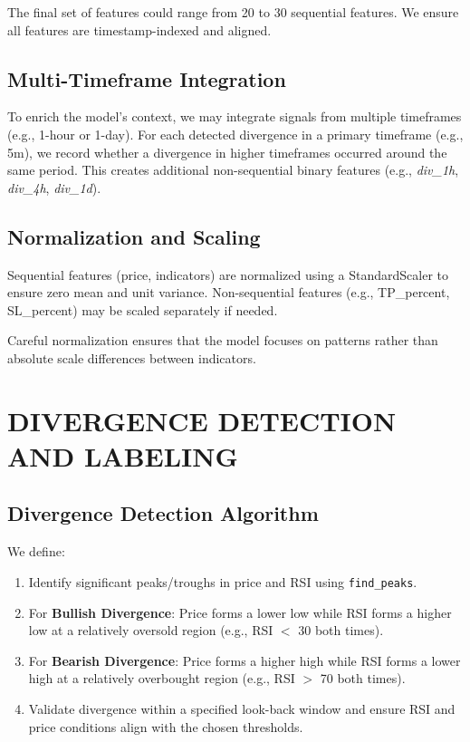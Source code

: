 \documentclass[letterpaper, 10 pt, conference]{ieeeconf}  %
\begin{document}
The final set of features could range from 20 to 30 sequential features. We ensure all features are timestamp-indexed and aligned.

\subsection{Multi-Timeframe Integration}
To enrich the model's context, we may integrate signals from multiple timeframes (e.g., 1-hour or 1-day). For each detected divergence in a primary timeframe (e.g., 5m), we record whether a divergence in higher timeframes occurred around the same period. This creates additional non-sequential binary features (e.g., \textit{div\_1h}, \textit{div\_4h}, \textit{div\_1d}).

\subsection{Normalization and Scaling}
Sequential features (price, indicators) are normalized using a StandardScaler to ensure zero mean and unit variance. Non-sequential features (e.g., TP\_percent, SL\_percent) may be scaled separately if needed.

Careful normalization ensures that the model focuses on patterns rather than absolute scale differences between indicators.

\section{DIVERGENCE DETECTION AND LABELING}

\subsection{Divergence Detection Algorithm}
We define:
\begin{enumerate}
    \item Identify significant peaks/troughs in price and RSI using \texttt{find\_peaks}.
    \item For \textbf{Bullish Divergence}: 
    Price forms a lower low while RSI forms a higher low at a relatively oversold region (e.g., RSI $<$ 30 both times).
    \item For \textbf{Bearish Divergence}:
    Price forms a higher high while RSI forms a lower high at a relatively overbought region (e.g., RSI $>$ 70 both times).
    \item Validate divergence within a specified look-back window and ensure RSI and price conditions align with the chosen thresholds.
\end{enumerate}
\end{document}
